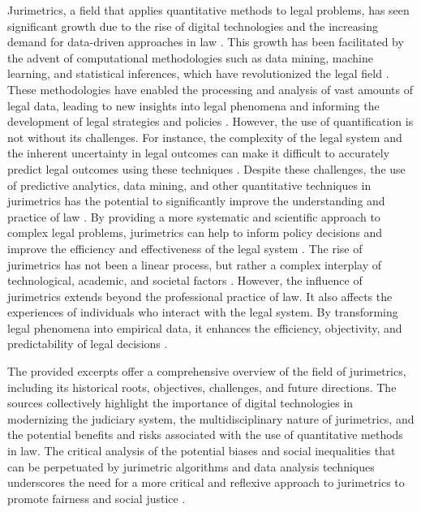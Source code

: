 Jurimetrics, a field that applies quantitative methods to legal problems, has seen significant growth due to the rise of digital technologies and the increasing demand for data-driven approaches in law \cite{biasquantitativeanalyses1,1023071190721}. This growth has been facilitated by the advent of computational methodologies such as data mining, machine learning, and statistical inferences, which have revolutionized the legal field \cite{1023071190721}. These methodologies have enabled the processing and analysis of vast amounts of legal data, leading to new insights into legal phenomena and informing the development of legal strategies and policies \cite{ccdacdfbcdaf,efbfffafaacadd,1023071190721}. However, the use of quantification is not without its challenges. For instance, the complexity of the legal system and the inherent uncertainty in legal outcomes can make it difficult to accurately predict legal outcomes using these techniques \cite{1023071190721}. Despite these challenges, the use of predictive analytics, data mining, and other quantitative techniques in jurimetrics has the potential to significantly improve the understanding and practice of law \cite{1023071190721}. By providing a more systematic and scientific approach to complex legal problems, jurimetrics can help to inform policy decisions and improve the efficiency and effectiveness of the legal system \cite{1023071190721}. The rise of jurimetrics has not been a linear process, but rather a complex interplay of technological, academic, and societal factors \cite{1023071190721}. However, the influence of jurimetrics extends beyond the professional practice of law. It also affects the experiences of individuals who interact with the legal system. By transforming legal phenomena into empirical data, it enhances the efficiency, objectivity, and predictability of legal decisions \cite{supiot2017,losano2006,101111/lsi12334,camargo2009,sareenetal2020,lynch2017}.

The provided excerpts offer a comprehensive overview of the field of jurimetrics, including its historical roots, objectives, challenges, and future directions. The sources collectively highlight the importance of digital technologies in modernizing the judiciary system, the multidisciplinary nature of jurimetrics, and the potential benefits and risks associated with the use of quantitative methods in law. The critical analysis of the potential biases and social inequalities that can be perpetuated by jurimetric algorithms and data analysis techniques underscores the need for a more critical and reflexive approach to jurimetrics to promote fairness and social justice \cite{10.20396/rdbci.v18i0.8658889, 10.32586/rcda.v18i1.585, 10.1007/s11186-021-09453-1, demortain2019politics, 10.3390/fi9040068}.

